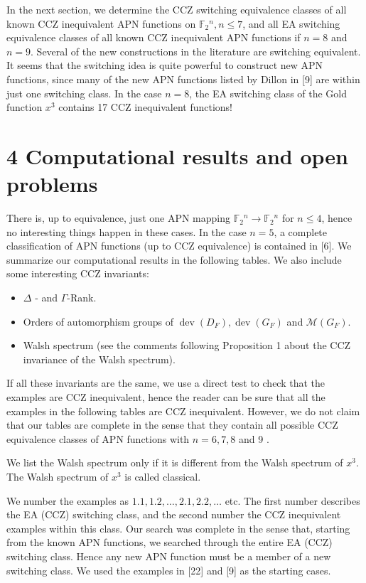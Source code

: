 \documentclass[10pt]{article}
\begin{document}
In the next section, we determine the CCZ switching equivalence classes of all known CCZ inequivalent APN functions on $\mathbb{F}_{2}{ }^{n}, n \leq 7$, and all EA switching equivalence classes of all known CCZ inequivalent APN functions if $n=8$ and $n=9$. Several of the new constructions in the literature are switching equivalent. It seems that the switching idea is quite powerful to construct new APN functions, since many of the new APN functions listed by Dillon in [9] are within just one switching class. In the case $n=8$, the EA switching class of the Gold function $x^{3}$ contains 17 CCZ inequivalent functions!

\section*{4 Computational results and open problems}
There is, up to equivalence, just one APN mapping $\mathbb{F}_{2}{ }^{n} \rightarrow \mathbb{F}_{2}{ }^{n}$ for $n \leq 4$, hence no interesting things happen in these cases. In the case $n=5$, a complete classification of APN functions (up to CCZ equivalence) is contained in [6]. We summarize our computational results in the following tables. We also include some interesting CCZ invariants:

\begin{itemize}
  \item $\Delta$ - and $\Gamma$-Rank.
  \item Orders of automorphism groups of $\operatorname{dev}\left(D_{F}\right), \operatorname{dev}\left(G_{F}\right)$ and $\mathcal{M}\left(G_{F}\right)$.
  \item Walsh spectrum (see the comments following Proposition 1 about the CCZ invariance of the Walsh spectrum).
\end{itemize}

If all these invariants are the same, we use a direct test to check that the examples are CCZ inequivalent, hence the reader can be sure that all the examples in the following tables are CCZ inequivalent. However, we do not claim that our tables are complete in the sense that they contain all possible CCZ equivalence classes of APN functions with $n=6,7,8$ and 9 .

We list the Walsh spectrum only if it is different from the Walsh spectrum of $x^{3}$. The Walsh spectrum of $x^{3}$ is called classical.

We number the examples as $1.1,1.2, \ldots, 2.1,2.2, \ldots$ etc. The first number describes the EA (CCZ) switching class, and the second number the CCZ inequivalent examples within this class. Our search was complete in the sense that, starting from the known APN functions, we searched through the entire EA (CCZ) switching class. Hence any new APN function must be a member of a new switching class. We used the examples in [22] and [9] as the starting cases.
\end{document}
